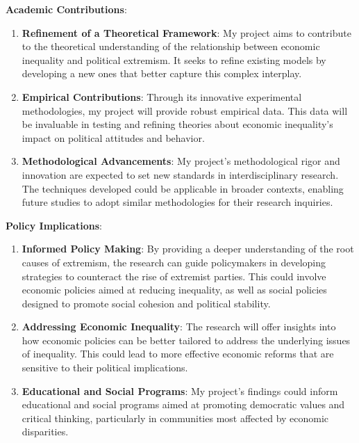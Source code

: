 \documentclass[letterpaper]{article}
\renewenvironment{itemize}{
  \begin{list}{}{
    \setlength{\leftmargin}{1.5em}
  }
}{
  \end{list}
}
\begin{document}
\begin{itemize}

  \item {\bf Academic Contributions}: 
    \begin{enumerate}
      \item {\bf Refinement of a Theoretical Framework}: My project aims to contribute to the theoretical understanding of the relationship between economic inequality and political extremism. It seeks to refine existing models by developing a new ones that better capture this complex interplay.

      \item {\bf Empirical Contributions}: Through its innovative experimental methodologies, my project will provide robust empirical data. This data will be invaluable in testing and refining theories about economic inequality's impact on political attitudes and behavior.

      \item {\bf Methodological Advancements}: My project's methodological rigor and innovation are expected to set new standards in interdisciplinary research. The techniques developed could be applicable in broader contexts, enabling future studies to adopt similar methodologies for their research inquiries.
    \end{enumerate}

  \item {\bf Policy Implications}: 
    \begin{enumerate}
      \item {\bf Informed Policy Making}: By providing a deeper understanding of the root causes of extremism, the research can guide policymakers in developing strategies to counteract the rise of extremist parties. This could involve economic policies aimed at reducing inequality, as well as social policies designed to promote social cohesion and political stability.

      \item {\bf Addressing Economic Inequality}: The research will offer insights into how economic policies can be better tailored to address the underlying issues of inequality. This could lead to more effective economic reforms that are sensitive to their political implications.

      \item {\bf Educational and Social Programs}: My project's findings could inform educational and social programs aimed at promoting democratic values and critical thinking, particularly in communities most affected by economic disparities.
    \end{enumerate}


\end{itemize}
\end{document}
